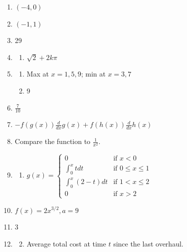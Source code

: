 \documentclass{article} \usepackage[margin=1in]{geometry}
\begin{document}
\begin{enumerate}
	\item $(-4,0)$
	\item $(-1,1)$
	\item 29
	      \setcounter{enumi}{62}
	\item
	      \begin{enumerate}
		      \item $\sqrt{2}+2k\pi$
	      \end{enumerate}
	      \setcounter{enumi}{64}
	\item \begin{enumerate}
		      \item Max at $x=1,5,9$; min at $x=3,7$
		      \item 9
	      \end{enumerate}
	      \setcounter{enumi}{66}
	\item $\frac{7}{10}$
	      \setcounter{enumi}{69}
	\item $-f(g(x))\frac{d}{dx}g(x)+f(h(x))\frac{d}{dx}h(x)$
	      \setcounter{enumi}{72}
	\item Compare the function to $\frac{1}{x^2}$.
	\item \begin{enumerate}
		      \item $g(x) = \begin{cases}
				            0                   & \text{if } x < 0      \\
				            \int_{0}^{x}tdt     & \text{if } 0\le x\le1 \\
				            \int_{0}^{x}(2-t)dt & \text{if } 1<x\le2    \\
				            0                   & \text{if } x>2
			            \end{cases}$
	      \end{enumerate}
	\item $f(x)=2x^{3/2}, a=9$
	\item 3
	\item \begin{enumerate}
		      \setcounter{enumii}{1}
		      \item Average total cost at time $t$ since the last overhaul.
	      \end{enumerate}
\end{enumerate}
\end{document}
